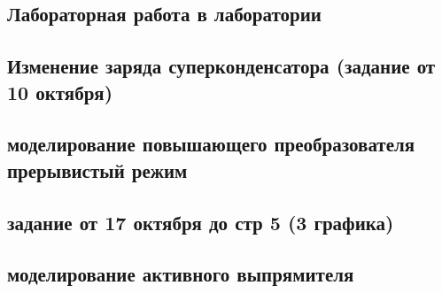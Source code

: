 \documentclass[a4paper,landscape,11pt]{article}
\begin{document}
\subsection{Лабораторная работа в лаборатории}
\subsection{Изменение заряда суперконденсатора (задание от 10 октября)}
\subsection{моделирование повышающего преобразователя прерывистый режим}
\subsection{задание от 17 октября до стр 5 (3 графика)}
\subsection{моделирование активного выпрямителя}
\end{document}

